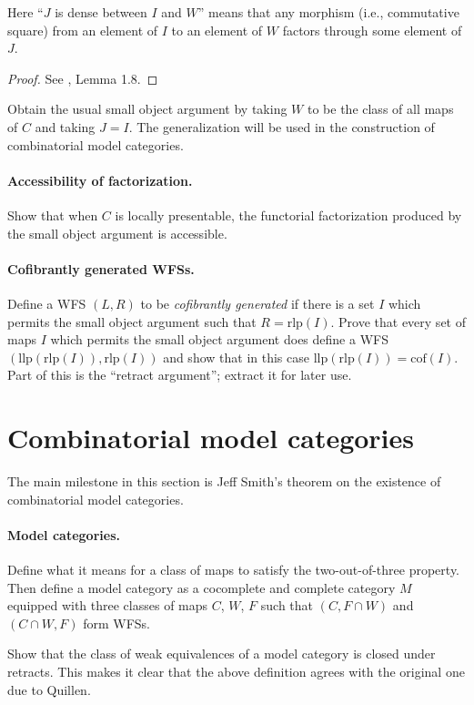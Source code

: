 \documentclass{article}
\theoremstyle{definition}
\theoremstyle{plain}
\newcommand{\cof}{\mathrm{cof}}
\newcommand{\llp}{\mathrm{llp}}
\newcommand{\rlp}{\mathrm{rlp}}
\begin{document}
Here ``$J$ is dense between $I$ and $W$'' means that any morphism (i.e., commutative square) from an element of $I$ to an element of $W$ factors through some element of $J$.

\begin{proof}
  See \cite{B}, Lemma 1.8.
\end{proof}

Obtain the usual small object argument by taking $W$ to be the class of all maps of $C$ and taking $J = I$.
The generalization will be used in the construction of combinatorial model categories.

\paragraph{Accessibility of factorization.}
Show that when $C$ is locally presentable, the functorial factorization produced by the small object argument is accessible.

\paragraph{Cofibrantly generated WFSs.}
Define a WFS $(L, R)$ to be \emph{cofibrantly generated} if there is a set $I$ which permits the small object argument such that $R = \rlp(I)$.
Prove that every set of maps $I$ which permits the small object argument does define a WFS $(\llp(\rlp(I)), \rlp(I))$ and show that in this case
$\llp(\rlp(I)) = \cof(I)$.
Part of this is the ``retract argument''; extract it for later use.

\section{Combinatorial model categories}

The main milestone in this section is Jeff Smith's theorem on the existence of combinatorial model categories.

\paragraph{Model categories.}
Define what it means for a class of maps to satisfy the two-out-of-three property.
Then define a model category as a cocomplete and complete category $M$ equipped with three classes of maps $C$, $W$, $F$ such that $(C, F \cap W)$ and $(C \cap W, F)$ form WFSs.

Show that the class of weak equivalences of a model category is closed under retracts.
This makes it clear that the above definition agrees with the original one due to Quillen.
\end{document}
